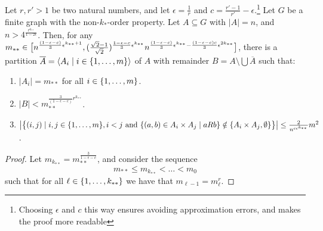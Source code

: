         \begin{theorem} \label{thm:existance_of_equitative_partition_with_perfect_pairs_but_with_bound_exceptional_pairs}
            Let $r, r' > 1$ be two natural numbers,
            and let $\epsilon = \frac{1}{r}$ and \mbox{$c = \frac{r' - 1}{r'} - \epsilon$}.\footnote{Choosing $\epsilon$ and
                $c$ this way ensures avoiding approximation errors, and makes the proof more readable}
            Let $G$ be a finite graph with the non-$k_*$-order property.
            Let $A \subseteq G$ with $|A| = n$, and $n > 4^{\frac{r^{k_{**}}}{1-2\epsilon}}$.
            Then, for any $m_{**} \in \bigl[ n^{\frac{(1-\epsilon-c)}{3}\epsilon^{k_{**}+1}},
            ( \frac{\sqrt{2}-1}{\sqrt{2}} )^{\frac{1-\epsilon-c}{3}\epsilon^{k_{**}}} n^{\frac{(1-\epsilon-c)}{3}\epsilon^{k_{**}} -
            \frac{(1-\epsilon-c)c}{3}\epsilon^{2k_{**}}} \bigr]$, there is a partition
            $\overline{A} = \left< A_i \mid i \in \{ 1, \dots, m \} \right>$ of $A$ with remainder
            $B = A \setminus \bigcup \overline{A}$ such that:
            \begin{enumerate}[label={\Roman*}., ref={\Roman*}, font=\rmfamily]
                \item\label{itm:existance_of_equitative_partition_with_perfect_pairs_but_with_bound_exceptional_pairs.1}
                    $|A_i| = m_{**}$ for all $i \in \{ 1, \dots, m \}$.
                \item\label{itm:existance_of_equitative_partition_with_perfect_pairs_but_with_bound_exceptional_pairs.2}
                    $|B| < m_{**}^{\frac{3}{(1-\epsilon-c)}r^{k_{**}}}$.
                \item\label{itm:existance_of_equitative_partition_with_perfect_pairs_but_with_bound_exceptional_pairs.3}
                    $\bigl| \bigl\{  (i,j) \mid i,j \in \{ 1, \dots, m \}, i < j \text{ and }
                    \{ (a,b) \in A_i \times A_j \mid a R b \} \notin
                    \{ A_i \times A_j, \emptyset \} \bigr\} \bigr|
                    \leq \frac{2}{n^{c\epsilon^{k_{**}}}} m^2$.
            \end{enumerate}
            \begin{proof}
                Let $m_{k_{**}} = m_{**}^{\frac{3}{1-\epsilon-c}}$, and consider the sequence
                \[
                    m_{**} \leq m_{k_{**}} < \dots < m_0
                \]
                such that for all $\ell \in \{ 1, \dots, k_{**} \}$ we have that $m_{\ell-1} = m_\ell^r$.

\end{proof}
\end{theorem}

